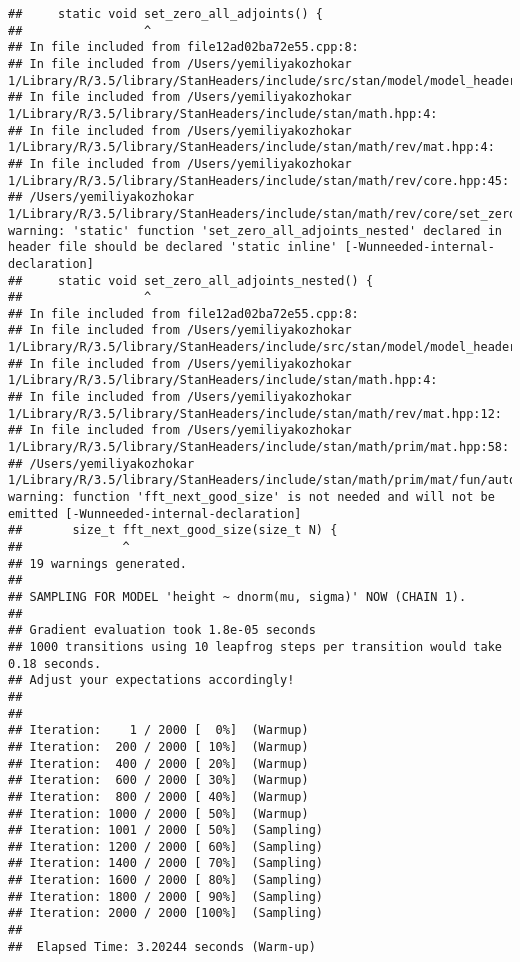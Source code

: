 \documentclass[]{article}
\begin{document}
\begin{verbatim}
##     static void set_zero_all_adjoints() {
##                 ^
## In file included from file12ad02ba72e55.cpp:8:
## In file included from /Users/yemiliyakozhokar 1/Library/R/3.5/library/StanHeaders/include/src/stan/model/model_header.hpp:4:
## In file included from /Users/yemiliyakozhokar 1/Library/R/3.5/library/StanHeaders/include/stan/math.hpp:4:
## In file included from /Users/yemiliyakozhokar 1/Library/R/3.5/library/StanHeaders/include/stan/math/rev/mat.hpp:4:
## In file included from /Users/yemiliyakozhokar 1/Library/R/3.5/library/StanHeaders/include/stan/math/rev/core.hpp:45:
## /Users/yemiliyakozhokar 1/Library/R/3.5/library/StanHeaders/include/stan/math/rev/core/set_zero_all_adjoints_nested.hpp:17:17: warning: 'static' function 'set_zero_all_adjoints_nested' declared in header file should be declared 'static inline' [-Wunneeded-internal-declaration]
##     static void set_zero_all_adjoints_nested() {
##                 ^
## In file included from file12ad02ba72e55.cpp:8:
## In file included from /Users/yemiliyakozhokar 1/Library/R/3.5/library/StanHeaders/include/src/stan/model/model_header.hpp:4:
## In file included from /Users/yemiliyakozhokar 1/Library/R/3.5/library/StanHeaders/include/stan/math.hpp:4:
## In file included from /Users/yemiliyakozhokar 1/Library/R/3.5/library/StanHeaders/include/stan/math/rev/mat.hpp:12:
## In file included from /Users/yemiliyakozhokar 1/Library/R/3.5/library/StanHeaders/include/stan/math/prim/mat.hpp:58:
## /Users/yemiliyakozhokar 1/Library/R/3.5/library/StanHeaders/include/stan/math/prim/mat/fun/autocorrelation.hpp:17:14: warning: function 'fft_next_good_size' is not needed and will not be emitted [-Wunneeded-internal-declaration]
##       size_t fft_next_good_size(size_t N) {
##              ^
## 19 warnings generated.
## 
## SAMPLING FOR MODEL 'height ~ dnorm(mu, sigma)' NOW (CHAIN 1).
## 
## Gradient evaluation took 1.8e-05 seconds
## 1000 transitions using 10 leapfrog steps per transition would take 0.18 seconds.
## Adjust your expectations accordingly!
## 
## 
## Iteration:    1 / 2000 [  0%]  (Warmup)
## Iteration:  200 / 2000 [ 10%]  (Warmup)
## Iteration:  400 / 2000 [ 20%]  (Warmup)
## Iteration:  600 / 2000 [ 30%]  (Warmup)
## Iteration:  800 / 2000 [ 40%]  (Warmup)
## Iteration: 1000 / 2000 [ 50%]  (Warmup)
## Iteration: 1001 / 2000 [ 50%]  (Sampling)
## Iteration: 1200 / 2000 [ 60%]  (Sampling)
## Iteration: 1400 / 2000 [ 70%]  (Sampling)
## Iteration: 1600 / 2000 [ 80%]  (Sampling)
## Iteration: 1800 / 2000 [ 90%]  (Sampling)
## Iteration: 2000 / 2000 [100%]  (Sampling)
## 
##  Elapsed Time: 3.20244 seconds (Warm-up)

\end{verbatim}
\end{document}
